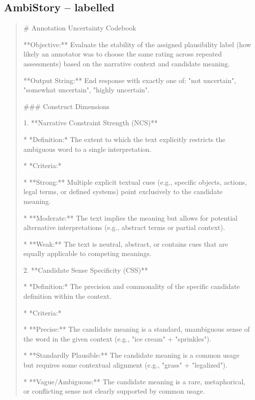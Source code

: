 \subsection*{AmbiStory -- labelled}
\begin{quote}\small
# Annotation Uncertainty Codebook



**Objective:** Evaluate the stability of the assigned plausibility label (how likely an annotator was to choose the same rating across repeated assessments) based on the narrative context and candidate meaning.



**Output String:** End response with exactly one of: "not uncertain", "somewhat uncertain", "highly uncertain".



### Construct Dimensions



1.  **Narrative Constraint Strength (NCS)**

    *   *Definition:* The extent to which the text explicitly restricts the ambiguous word to a single interpretation.

    *   *Criteria:*

        *   **Strong:** Multiple explicit textual cues (e.g., specific objects, actions, legal terms, or defined systems) point exclusively to the candidate meaning.

        *   **Moderate:** The text implies the meaning but allows for potential alternative interpretations (e.g., abstract terms or partial context).

        *   **Weak:** The text is neutral, abstract, or contains cues that are equally applicable to competing meanings.



2.  **Candidate Sense Specificity (CSS)**

    *   *Definition:* The precision and commonality of the specific candidate definition within the context.

    *   *Criteria:*

        *   **Precise:** The candidate meaning is a standard, unambiguous sense of the word in the given context (e.g., "ice cream" + "sprinkles").

        *   **Standardly Plausible:** The candidate meaning is a common usage but requires some contextual alignment (e.g., "grass" + "legalized").

        *   **Vague/Ambiguous:** The candidate meaning is a rare, metaphorical, or conflicting sense not clearly supported by common usage.




\end{quote}
